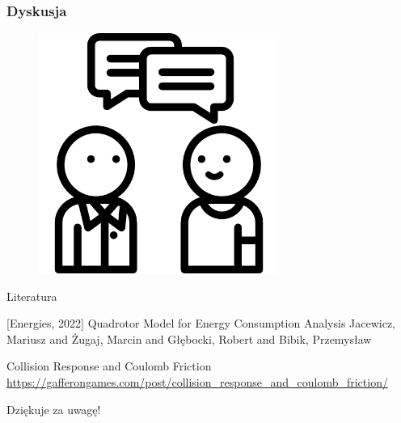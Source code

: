 \documentclass[aspectratio=169]{beamer}
\begin{document}
\begin{frame}
	\frametitle{Dyskusja}
	\begin{figure}
		\centering
		\includegraphics[width=0.7\textwidth]{questions.png}
	\end{figure}
\end{frame}

\begin{frame}{Literatura}
\begin{thebibliography}{10}
\beamertemplatebookbibitems
{}[Energies, 2022] Quadrotor Model for Energy Consumption Analysis
   \newblock  Jacewicz, Mariusz and Żugaj, Marcin and Głębocki, Robert and Bibik, Przemysław
   
  Collision Response and Coulomb Friction
 \newblock \url{https://gafferongames.com/post/collision_response_and_coulomb_friction/}

\end{thebibliography}
\end{frame}

\begin{frame}
	  \begin{center}
	\Huge Dziękuje za uwagę!
	\end{center}
\end{frame}
\end{document}
